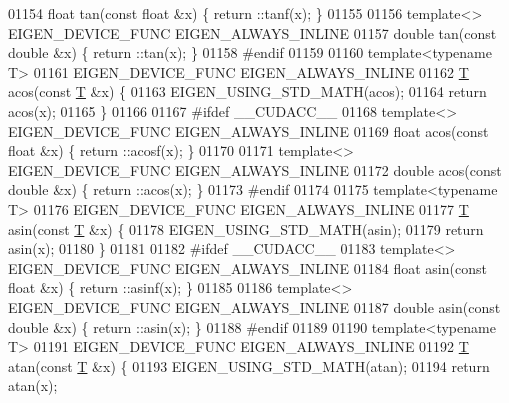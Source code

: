 \begin{DoxyCode}
01154 \textcolor{keywordtype}{float} tan(\textcolor{keyword}{const} \textcolor{keywordtype}{float} &x) \{ return ::tanf(x); \}
01155 
01156 \textcolor{keyword}{template}<> EIGEN\_DEVICE\_FUNC EIGEN\_ALWAYS\_INLINE
01157 \textcolor{keywordtype}{double} tan(\textcolor{keyword}{const} \textcolor{keywordtype}{double} &x) \{ return ::tan(x); \}
01158 \textcolor{preprocessor}{#endif}
01159 
01160 \textcolor{keyword}{template}<\textcolor{keyword}{typename} T>
01161 EIGEN\_DEVICE\_FUNC EIGEN\_ALWAYS\_INLINE
01162 \hyperlink{group___sparse_core___module_class_eigen_1_1_triplet}{T} acos(\textcolor{keyword}{const} \hyperlink{group___sparse_core___module_class_eigen_1_1_triplet}{T} &x) \{
01163   EIGEN\_USING\_STD\_MATH(acos);
01164   \textcolor{keywordflow}{return} acos(x);
01165 \}
01166 
01167 \textcolor{preprocessor}{#ifdef \_\_CUDACC\_\_}
01168 \textcolor{keyword}{template}<> EIGEN\_DEVICE\_FUNC EIGEN\_ALWAYS\_INLINE
01169 \textcolor{keywordtype}{float} acos(\textcolor{keyword}{const} \textcolor{keywordtype}{float} &x) \{ return ::acosf(x); \}
01170 
01171 \textcolor{keyword}{template}<> EIGEN\_DEVICE\_FUNC EIGEN\_ALWAYS\_INLINE
01172 \textcolor{keywordtype}{double} acos(\textcolor{keyword}{const} \textcolor{keywordtype}{double} &x) \{ return ::acos(x); \}
01173 \textcolor{preprocessor}{#endif}
01174 
01175 \textcolor{keyword}{template}<\textcolor{keyword}{typename} T>
01176 EIGEN\_DEVICE\_FUNC EIGEN\_ALWAYS\_INLINE
01177 \hyperlink{group___sparse_core___module_class_eigen_1_1_triplet}{T} asin(\textcolor{keyword}{const} \hyperlink{group___sparse_core___module_class_eigen_1_1_triplet}{T} &x) \{
01178   EIGEN\_USING\_STD\_MATH(asin);
01179   \textcolor{keywordflow}{return} asin(x);
01180 \}
01181 
01182 \textcolor{preprocessor}{#ifdef \_\_CUDACC\_\_}
01183 \textcolor{keyword}{template}<> EIGEN\_DEVICE\_FUNC EIGEN\_ALWAYS\_INLINE
01184 \textcolor{keywordtype}{float} asin(\textcolor{keyword}{const} \textcolor{keywordtype}{float} &x) \{ return ::asinf(x); \}
01185 
01186 \textcolor{keyword}{template}<> EIGEN\_DEVICE\_FUNC EIGEN\_ALWAYS\_INLINE
01187 \textcolor{keywordtype}{double} asin(\textcolor{keyword}{const} \textcolor{keywordtype}{double} &x) \{ return ::asin(x); \}
01188 \textcolor{preprocessor}{#endif}
01189 
01190 \textcolor{keyword}{template}<\textcolor{keyword}{typename} T>
01191 EIGEN\_DEVICE\_FUNC EIGEN\_ALWAYS\_INLINE
01192 \hyperlink{group___sparse_core___module_class_eigen_1_1_triplet}{T} atan(\textcolor{keyword}{const} \hyperlink{group___sparse_core___module_class_eigen_1_1_triplet}{T} &x) \{
01193   EIGEN\_USING\_STD\_MATH(atan);
01194   \textcolor{keywordflow}{return} atan(x);

\end{DoxyCode}
